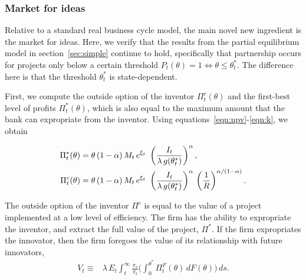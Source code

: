 \documentclass[12pt]{article}
\begin{document}
\subsubsection{Market for ideas}

Relative to a standard real business cycle model, the main novel new ingredient is the market for ideas. Here, we verify that the results from the partial equilibrium model in section~\ref{sec:simple} continue to hold, specifically that  partnership occurs for projects only below a certain threshold $P_t(\theta)=1 \Leftrightarrow \theta\leq\theta^*_t$. The difference here is that the threshold $\theta_t^*$ is state-dependent.

First, we compute the outside option of the inventor $\Pi_t^c(\theta)$ and the first-best level of profits $\Pi^*_t(\theta)$, which is also equal to the maximum amount that the bank can expropriate from the inventor. Using equations~\eqref{eqn:npv}-\eqref{eqn:k}, we obtain

\begin{align}\notag
\Pi^*_t (\theta)  &= \theta\,(1-\alpha)\, M_t \,e^{\xi_t}\,  \,\left(\frac{ I_t }{\lambda\, g(\theta_t^*)}\right)^\alpha, \\\label{eqn:P}
\Pi^c_t (\theta)  &= \theta\,(1-\alpha)\, M_t \,e^{\xi_t}\,  \,\left(\frac{ I_t }{ \lambda\, g(\theta_t^*)}\right)^\alpha \,\left(\frac{1}{R}\right)^{\alpha/(1-\alpha)} .
\end{align}

The outside option of the inventor $\Pi^c$ is equal to the value of a project implemented at a low level of efficiency. The firm has the ability to expropriate the inventor, and extract the full value of the project, $\Pi^*$. If the firm expropriates the innovator, then the firm foregoes the value of its relationship with future innovators,
\begin{align}\label{eqn:V}
V_t \equiv & \lambda \,E_t \int_t^\infty \frac{\pi_s}{\pi_t} \Bigg(  \int_0^{\theta^*} \Pi_t^F(\theta) \, d F(\theta) \Bigg) \,ds.
\end{align}
\end{document}
